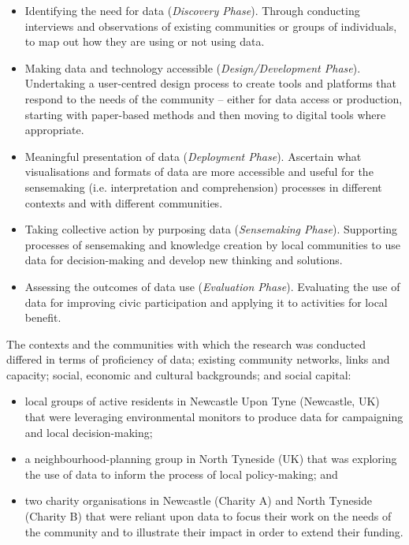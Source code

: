 \begin{introduction}
\begin{itemize}
  \item Identifying the need for data (\textit{Discovery Phase}). Through conducting interviews and observations of existing communities or groups of individuals, to map out how they are using or not using data.
  
  \item Making data and technology accessible (\textit{Design/Development Phase}). Undertaking a user-centred design process to create tools and platforms that respond to the needs of the community -- either for data access or production, starting with paper-based methods and then moving to digital tools where appropriate.
  
  \item Meaningful presentation of data (\textit{Deployment Phase}). Ascertain what visualisations and formats of data are more accessible and useful for the sensemaking (i.e. interpretation and comprehension) processes in different contexts and with different communities.
  
  \item Taking collective action by purposing data (\textit{Sensemaking Phase}). Supporting processes of sensemaking and knowledge creation by local communities to use data for decision-making and develop new thinking and solutions.
  
  \item Assessing the outcomes of data use (\textit{Evaluation Phase}). Evaluating the use of data for improving civic participation and applying it to activities for local benefit.
\end{itemize}

The contexts and the communities with which the research was conducted differed in terms of proficiency of data; existing community networks, links and capacity; social, economic and cultural backgrounds; and social capital:

\begin{itemize}
    \item local groups of active residents in Newcastle Upon Tyne (Newcastle, UK) that were leveraging environmental monitors to produce data for campaigning and local decision-making;
    \item a neighbourhood-planning group in North Tyneside (UK) that was exploring the use of data to inform the process of local policy-making; and
    \item two charity organisations in Newcastle (Charity A) and North Tyneside (Charity B) that were reliant upon data to focus their work on the needs of the community and to illustrate their impact in order to extend their funding.
\end{itemize}


\end{introduction}
